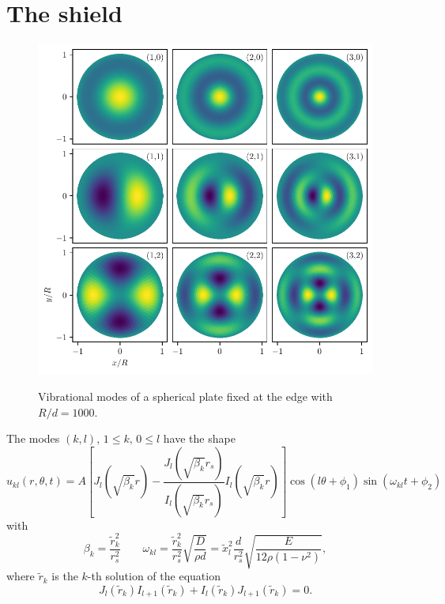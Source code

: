 \chapter{The shield}\label{cha:the-shield}

\begin{figure}[!htbp]
  \centering
  \includegraphics[width=\textwidth]{./../figures/vibrations/vibrational-modes.pdf}
  \label{fig:4:vibrational-modes}
  \caption{Vibrational modes of a spherical plate fixed at the edge with $R/d = 1000$.}
\end{figure}







The modes $(k,l),\, 1 \leq k, \, 0 \leq l$ have the shape
\begin{equation}
  u_{kl}(r, \theta, t) = A\left[J_l(\sqrt{\beta_k}r) - \frac{J_l(\sqrt{\beta_k}r_s)}{I_l(\sqrt{\beta_k}r_s)}I_l(\sqrt{\beta_k}r)\right]\cos(l\theta+\phi_1)\sin(\omega_{kl}t+\phi_2)
\end{equation}
with
\begin{equation}
  \beta_k = \frac{\tilde{r}_k^2}{r_s^2} \quad \quad \omega_{kl} = \frac{\tilde{r}_k^2}{r_s^2}\sqrt{\frac{D}{\rho d}} = \tilde{x}_l^2\frac{d}{r_s^2}\sqrt{\frac{E}{12\rho(1-\nu^2)}} ,
\end{equation}
where $\tilde{r}_k$ is the $k$-th solution of the equation
\begin{equation}
  J_l(\tilde{r}_k)I_{l+1}(\tilde{r}_k)+I_l(\tilde{r}_k)J_{l+1}(\tilde{r}_k) = 0 .
\end{equation}


